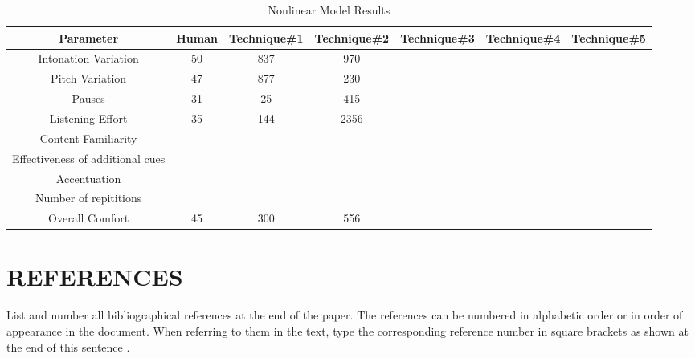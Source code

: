 \documentclass{article}
\begin{document}
\begin{table}[t]
\caption{Nonlinear Model Results}

\vspace{8pt} %

\centering
\begin{tabular}{c c c c c c c}
\hline\hline %
Parameter & Human & Technique\#1 & Technique\#2 & Technique\#3 & Technique\#4 & Technique\#5 \\[0.5ex]
\hline
Intonation Variation & 50 & 837 & 970 \\
Pitch  Variation& 47 & 877 & 230 \\
Pauses & 31 & 25 & 415 \\
Listening Effort & 35 & 144 & 2356 \\
Content Familiarity \\
Effectiveness of additional cues \\
Accentuation \\
Number of repititions \\
Overall Comfort & 45 & 300 & 556 \\ [1ex]
\hline


\end{tabular}
\end{table}


\section{REFERENCES}
\label{sec:ref}

List and number all bibliographical references at the end of the paper.  The references can be numbered in alphabetic order or in order of appearance in the document.  When referring to them in the text, type the corresponding reference number in square brackets as shown at the end of this sentence \cite{C2}.



\end{document}

